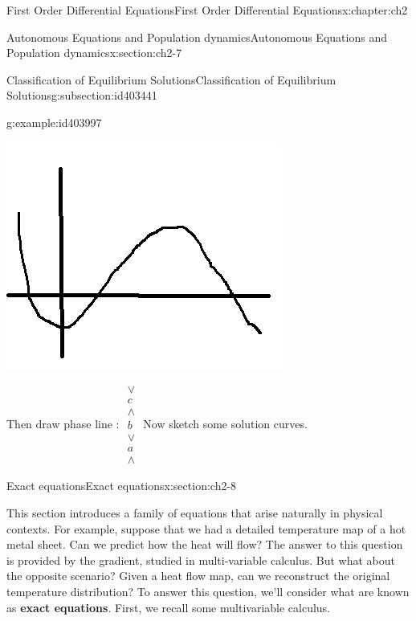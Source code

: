\documentclass[oneside,10pt,]{book}
\newcommand{\terminology}[1]{\textbf{#1}}
\numberwithin{equation}{section}
\numberwithin{equation}{section}
\begin{document}
\begin{chapterptx}{First Order Differential Equations}{}{First Order Differential Equations}{}{}{x:chapter:ch2}
\begin{sectionptx}{Autonomous Equations and Population dynamics}{}{Autonomous Equations and Population dynamics}{}{}{x:section:ch2-7}
\begin{subsectionptx}{Classification of Equilibrium Solutions}{}{Classification of Equilibrium Solutions}{}{}{g:subsection:id403441}
\begin{example}{}{g:example:id403997}
\begin{image}{0}{1}{0}
\includegraphics[width=\linewidth]{images/1.6-f(y).png}
\end{image}%
 Then draw phase line : \(\begin{array}{c}
\vee\\
c\\
\wedge\\
b\\
\vee\\
a\\
\wedge
\end{array}\) Now sketch some solution curves.%
%
\end{example}
\end{subsectionptx}
\end{sectionptx}
%
%
\typeout{************************************************}
\typeout{************************************************}
%
\begin{sectionptx}{Exact equations}{}{Exact equations}{}{}{x:section:ch2-8}
\begin{introduction}{}%
This section introduces a family of equations that arise naturally in physical contexts. For example, suppose that we had a detailed temperature map of a hot metal sheet. Can we predict how the heat will flow? The answer to this question is provided by the gradient, studied in multi-variable calculus. But what about the opposite scenario? Given a heat flow map, can we reconstruct the original temperature distribution? To answer this question, we'll consider what are known as \terminology{exact equations}. First, we recall some multivariable calculus.%

\end{introduction}
\end{sectionptx}
\end{chapterptx}
\end{document}
